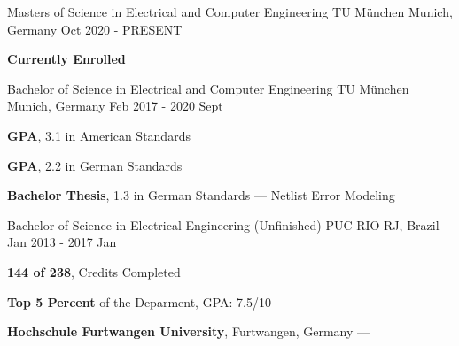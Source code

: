 
\begin{cventries}
  \cventry
    {Masters of Science in Electrical and Computer Engineering} %
    {TU München} %
    {Munich, Germany} %
    {Oct 2020 - PRESENT} %
    {
      \begin{cvitems} %
      \item {\textbf{Currently Enrolled}}
      \end{cvitems}
    }

  \cventry
    {Bachelor of Science in Electrical and Computer Engineering} %
    {TU München} %
    {Munich, Germany} %
    {Feb 2017 - 2020 Sept} %
    {
      \begin{cvitems} %
      \item {\textbf{GPA}, 3.1 in American Standards}
         \vspace{0.5mm}
         \item {\textbf{GPA}, 2.2 in German Standards}
         \vspace{0.5mm}
         \item {\textbf{Bachelor Thesis}, 1.3 in German Standards --- Netlist Error Modeling}
      \end{cvitems}
    }

  \cventry
    {Bachelor of Science in Electrical Engineering (Unfinished)} %
    {PUC-RIO} %
    {RJ, Brazil} %
    {Jan 2013 - 2017 Jan} %
    {
      \begin{cvitems} %
        \item {\textbf{144 of 238}, Credits Completed}
        \vspace{0.5mm}
        \item {\textbf{Top 5 Percent} of the Deparment, GPA: 7.5/10}
        \vspace{0.5mm}
        \item {\textbf{Hochschule Furtwangen University}, Furtwangen, Germany --- }
      \end{cvitems}
    }
\end{cventries}
